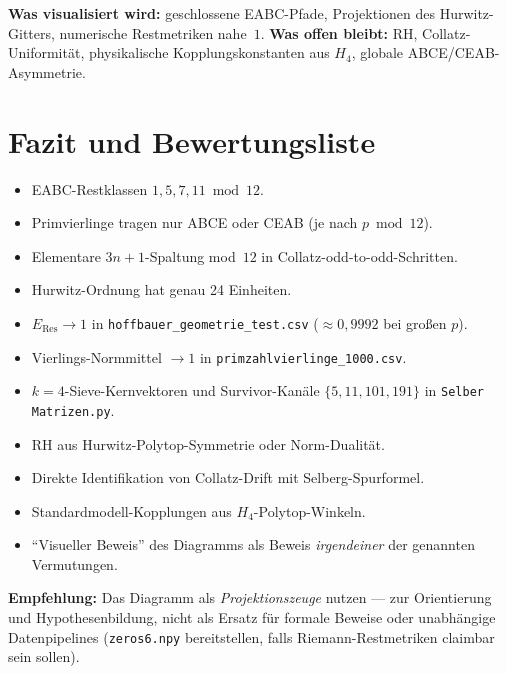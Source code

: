 \documentclass[12pt,a4paper]{article}
\begin{document}
\begin{tcolorbox}[kern]
\textbf{Was visualisiert wird:} geschlossene EABC-Pfade,
Projektionen des Hurwitz-Gitters, numerische Restmetriken nahe~$1$.
\textbf{Was offen bleibt:} RH, Collatz-Uniformität, physikalische
Kopplungskonstanten aus $H_4$, globale ABCE/CEAB-Asymmetrie.
\end{tcolorbox}

\section{Fazit und Bewertungsliste}
\label{sec:fazit}

\begin{tcolorbox}[bewiesen,title={Bewiesen / standard}]
\begin{itemize}[nosep]
  \item EABC-Restklassen $1,5,7,11\bmod 12$.
  \item Primvierlinge tragen nur ABCE oder CEAB (je nach $p\bmod{12}$).
  \item Elementare $3n+1$-Spaltung mod~$12$ in Collatz-odd-to-odd-Schritten.
  \item Hurwitz-Ordnung hat genau 24 Einheiten.
\end{itemize}
\end{tcolorbox}

\begin{tcolorbox}[numerisch,title={Numerisch dokumentiert}]
\begin{itemize}[nosep]
  \item $E_{\mathrm{Res}}\to 1$ in \texttt{hoffbauer\_geometrie\_test.csv}
        ($\approx 0{,}9992$ bei großen $p$).
  \item Vierlings-Normmittel $\to 1$ in \texttt{primzahlvierlinge\_1000.csv}.
  \item $k=4$-Sieve-Kernvektoren und Survivor-Kanäle
        $\{5,11,101,191\}$ in \texttt{Selber Matrizen.py}.
\end{itemize}
\end{tcolorbox}

\begin{tcolorbox}[heuristik,title={Spekulativ / heuristisch}]
\begin{itemize}[nosep]
  \item RH aus Hurwitz-Polytop-Symmetrie oder Norm-Dualität.
  \item Direkte Identifikation von Collatz-Drift mit Selberg-Spurformel.
  \item Standardmodell-Kopplungen aus $H_4$-Polytop-Winkeln.
  \item ``Visueller Beweis'' des Diagramms als Beweis \emph{irgendeiner}
        der genannten Vermutungen.
\end{itemize}
\end{tcolorbox}

\medskip
\noindent
\textbf{Empfehlung:} Das Diagramm als \emph{Projektionszeuge} nutzen ---
zur Orientierung und Hypothesenbildung, nicht als Ersatz für
formale Beweise oder unabhängige Datenpipelines
(\texttt{zeros6.npy} bereitstellen, falls Riemann-Restmetriken
claimbar sein sollen).
\end{document}
